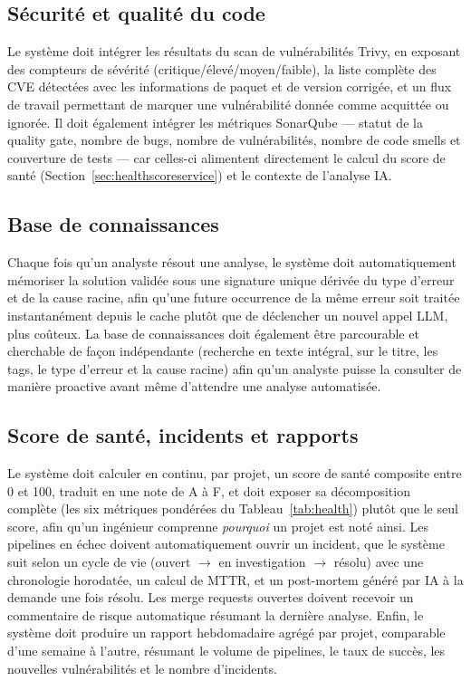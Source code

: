 \documentclass[12pt,a4paper,oneside]{report}
\begin{document}
\subsection{Sécurité et qualité du code}
Le système doit intégrer les résultats du scan de vulnérabilités Trivy, en exposant des compteurs de sévérité (critique/élevé/moyen/faible), la liste complète des CVE détectées avec les informations de paquet et de version corrigée, et un flux de travail permettant de marquer une vulnérabilité donnée comme acquittée ou ignorée. Il doit également intégrer les métriques SonarQube --- statut de la quality gate, nombre de bugs, nombre de vulnérabilités, nombre de code smells et couverture de tests --- car celles-ci alimentent directement le calcul du score de santé (Section~\ref{sec:healthscoreservice}) et le contexte de l'analyse IA.

\subsection{Base de connaissances}
Chaque fois qu'un analyste résout une analyse, le système doit automatiquement mémoriser la solution validée sous une signature unique dérivée du type d'erreur et de la cause racine, afin qu'une future occurrence de la même erreur soit traitée instantanément depuis le cache plutôt que de déclencher un nouvel appel LLM, plus coûteux. La base de connaissances doit également être parcourable et cherchable de façon indépendante (recherche en texte intégral, sur le titre, les tags, le type d'erreur et la cause racine) afin qu'un analyste puisse la consulter de manière proactive avant même d'attendre une analyse automatisée.

\subsection{Score de santé, incidents et rapports}
Le système doit calculer en continu, par projet, un score de santé composite entre 0 et 100, traduit en une note de A à F, et doit exposer sa décomposition complète (les six métriques pondérées du Tableau~\ref{tab:health}) plutôt que le seul score, afin qu'un ingénieur comprenne \emph{pourquoi} un projet est noté ainsi. Les pipelines en échec doivent automatiquement ouvrir un incident, que le système suit selon un cycle de vie (ouvert $\rightarrow$ en investigation $\rightarrow$ résolu) avec une chronologie horodatée, un calcul de MTTR, et un post-mortem généré par IA à la demande une fois résolu. Les merge requests ouvertes doivent recevoir un commentaire de risque automatique résumant la dernière analyse. Enfin, le système doit produire un rapport hebdomadaire agrégé par projet, comparable d'une semaine à l'autre, résumant le volume de pipelines, le taux de succès, les nouvelles vulnérabilités et le nombre d'incidents.
\end{document}
